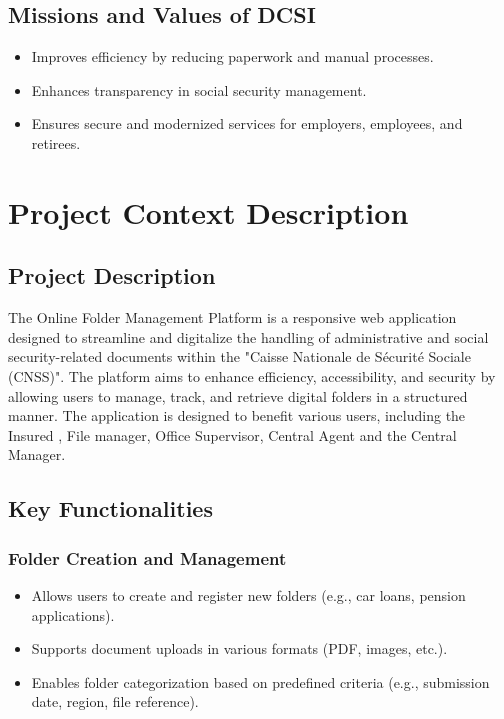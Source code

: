 \subsection{ Missions and Values of DCSI} 
\begin{itemize}
    \item Improves efficiency by reducing paperwork and manual processes.
    \item Enhances transparency in social security management.
    \item Ensures secure and modernized services for employers, employees, and retirees.
\end{itemize}

\section{Project Context Description}
\subsection{Project Description}
The Online Folder Management Platform is a responsive web application designed to streamline and digitalize the handling of administrative and social security-related documents within the "Caisse Nationale de Sécurité Sociale (CNSS)". The platform aims to enhance efficiency, accessibility, and security by allowing users to manage, track, and retrieve digital folders in a structured manner.
The application is designed to benefit various users, including the Insured , File manager, Office Supervisor, Central Agent and the Central Manager. 

\subsection{Key Functionalities}
\subsubsection{ Folder Creation and Management}
\begin{itemize}
    \item Allows users to create and register new folders (e.g., car loans, pension applications).
    \item Supports document uploads in various formats (PDF, images, etc.).
    \item Enables folder categorization based on predefined criteria (e.g., submission date, region, file reference).
\end{itemize}

